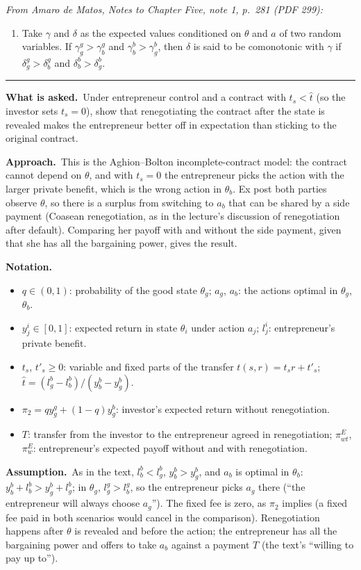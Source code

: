 \documentclass[11pt,a4paper]{article}
\newcommand{\notation}{\par\noindent\textbf{Notation.}}
\newcommand{\assume}{\par\smallskip\noindent\textbf{Assumption.}~}
\newcommand{\asked}{\par\medskip\noindent\textbf{What is asked.}~}
\newcommand{\approach}{\par\smallskip\noindent\textbf{Approach.}~}
\providecommand{\tightlist}{\setlength{\itemsep}{0pt}\setlength{\parskip}{0pt}}
\newcommand{\stmtend}{\par\endgroup\nopagebreak\noindent\rule{\linewidth}{0.4pt}\par\medskip}
\begin{document}
\emph{From Amaro de Matos, Notes to Chapter Five, note 1, p.~281 (PDF 299):}

\begin{enumerate}
\def\labelenumi{\arabic{enumi}.}
\tightlist
\item
  Take \(\gamma\) and \(\delta\) as the expected values conditioned on \(\theta\) and \(a\) of two
  random variables. If \(\gamma^g_g > \gamma^g_b\) and \(\gamma^b_b > \gamma^b_g\), then \(\delta\)
  is said to be comonotonic with \(\gamma\) if \(\delta^g_g > \delta^g_b\) and
  \(\delta^b_b > \delta^b_g\).
\end{enumerate}
\stmtend

\asked Under entrepreneur control and a contract with $t_s<\hat t$ (so the investor sets $t_s=0$),
show that renegotiating the contract after the state is revealed makes the entrepreneur better off in
expectation than sticking to the original contract.

\approach This is the Aghion--Bolton incomplete-contract model: the contract cannot depend on $\theta$,
and with $t_s=0$ the entrepreneur picks the action with the larger private benefit, which is the wrong
action in $\theta_b$. Ex post both parties observe $\theta$, so there is a surplus from switching to
$a_b$ that can be shared by a side payment (Coasean renegotiation, as in the lecture's discussion of
renegotiation after default). Comparing her payoff with and without the side payment, given that she
has all the bargaining power, gives the result.

\notation
\begin{itemize}
  \item $q\in(0,1)$: probability of the good state $\theta_g$; $a_g$, $a_b$: the actions optimal in $\theta_g$, $\theta_b$.
  \item $y^i_j\in[0,1]$: expected return in state $\theta_i$ under action $a_j$; $l^i_j$: entrepreneur's private benefit.
  \item $t_s$, $t'_s\geq0$: variable and fixed parts of the transfer $t(s,r)=t_sr+t'_s$; $\hat t=(l^b_g-l^b_b)/(y^b_b-y^b_g)$.
  \item $\pi_2=qy^g_g+(1-q)y^b_g$: investor's expected return without renegotiation.
  \item $T$: transfer from the investor to the entrepreneur agreed in renegotiation; $\pi^E_{wt}$, $\pi^E_w$: entrepreneur's expected payoff without and with renegotiation.
\end{itemize}

\assume As in the text, $l^b_b<l^b_g$, $y^b_b>y^b_g$, and $a_b$ is optimal in $\theta_b$:
$y^b_b+l^b_b>y^b_g+l^b_g$; in $\theta_g$, $l^g_g>l^g_b$, so the entrepreneur picks $a_g$ there
(``the entrepreneur will always choose $a_g$''). The fixed fee is zero, as $\pi_2$ implies (a fixed fee
paid in both scenarios would cancel in the comparison). Renegotiation happens after $\theta$ is revealed
and before the action; the entrepreneur has all the bargaining power and offers to take $a_b$ against
a payment $T$ (the text's ``willing to pay up to'').
\end{document}

